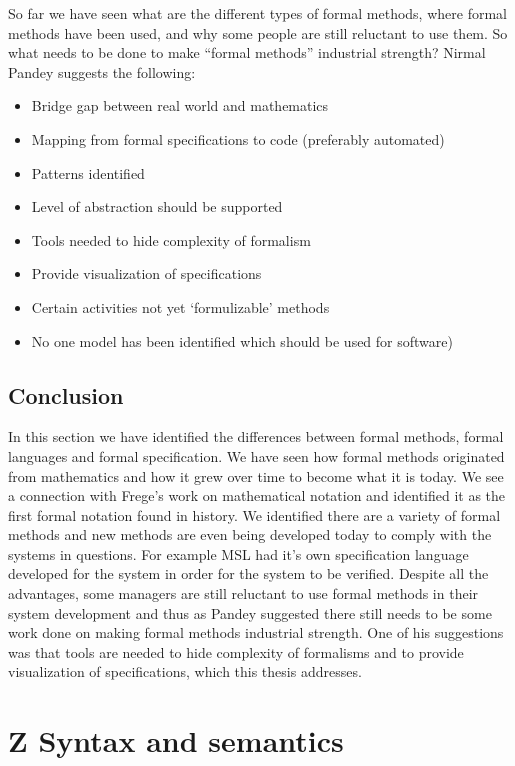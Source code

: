 So far we have seen what are the different types of formal methods, where formal methods have been used, and why some people are still reluctant to use them. So what needs to be done to make “formal methods” industrial strength? Nirmal Pandey \cite{formalmethodslides} suggests the following: 

\begin{itemize}
\item Bridge gap between real world and mathematics
\item Mapping from formal specifications to code (preferably automated)
\item Patterns identified
\item Level of abstraction should be supported
\item Tools needed to hide complexity of formalism
\item Provide visualization of specifications 
\item Certain activities not yet ‘formulizable’ methods
\item No one model has been identified which should be used for software)
\end{itemize}


\subsection{Conclusion}

In this section we have identified the differences between formal methods, formal languages and formal specification. We have seen how formal methods originated from mathematics and how it grew over time to become what it is today. We see a connection with Frege's work on mathematical notation and identified it as the first formal notation found in history. We identified there are a variety of formal methods and new methods are even being developed today to comply with the systems in questions. For example MSL had it's own specification language developed for the system in order for the system to be verified. Despite all the advantages, some managers are still reluctant to use formal methods in their system development and thus as Pandey suggested there still needs to be some work done on making formal methods industrial strength. One of his suggestions was that tools are needed to hide complexity of formalisms and to provide visualization of specifications, which this thesis addresses.

\section{Z Syntax and semantics}
\label{sec:theznotation}

